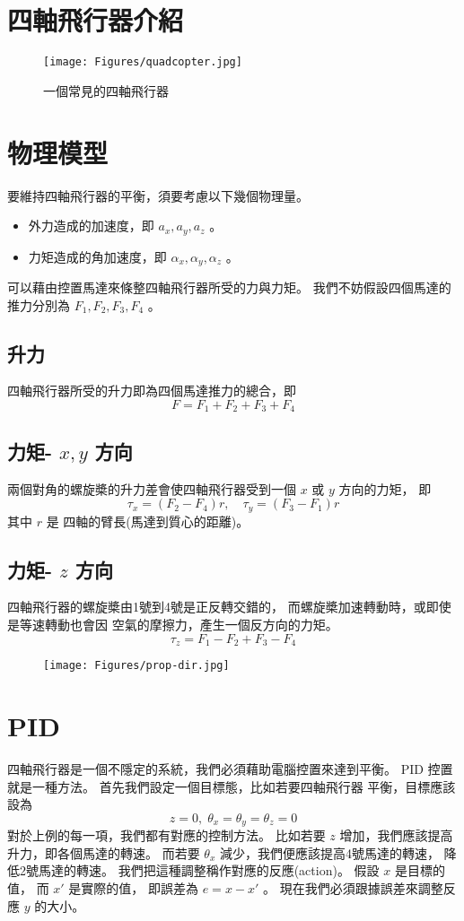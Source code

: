 \documentclass[12pt, a4paper]{article}
\begin{document}
\section{四軸飛行器介紹}
\begin{figure}[H]
  \centering
  \texttt{[image: Figures/quadcopter.jpg]}
\caption{一個常見的四軸飛行器}
\label{fig:}
\end{figure}

\section{物理模型}
要維持四軸飛行器的平衡，須要考慮以下幾個物理量。
\begin{itemize}
  \item 外力造成的加速度，即 $a_x, a_y, a_z$ 。 
  \item 力矩造成的角加速度，即 $\alpha_x, \alpha_y, \alpha_z$ 。 
\end{itemize}
可以藉由控置馬達來條整四軸飛行器所受的力與力矩。
我們不妨假設四個馬達的推力分別為 $F_1, F_2, F_3, F_4$ 。

\subsection{升力}
四軸飛行器所受的升力即為四個馬達推力的總合，即
 \[ F = F_1 + F_2 + F_3 + F_4 \]

\subsection{力矩- $x, y$ 方向}
兩個對角的螺旋槳的升力差會使四軸飛行器受到一個 $x$ 或 $y$ 方向的力矩，
即
\[ \tau_x = (F_2 - F_4) r, \quad \tau_y = (F_3 - F_1) r \]
其中 $r$ 是 四軸的臂長(馬達到質心的距離)。

\subsection{力矩- $z$ 方向}
四軸飛行器的螺旋槳由1號到4號是正反轉交錯的，
而螺旋槳加速轉動時，或即使是等速轉動也會因
空氣的摩擦力，產生一個反方向的力矩。
 \[ \tau_z = F_1 - F_2 + F_3 - F_4 \]
 \begin{figure}[H]
  \centering
  \texttt{[image: Figures/prop-dir.jpg]}
\caption{}
\label{fig:}
\end{figure}

\section{PID}
四軸飛行器是一個不隱定的系統，我們必須藉助電腦控置來達到平衡。
PID 控置就是一種方法。 首先我們設定一個目標態，比如若要四軸飛行器
平衡，目標應該設為
\[ z = 0, \; \theta_x = \theta_y = \theta_z = 0 \]
對於上例的每一項，我們都有對應的控制方法。
比如若要 $z$ 增加，我們應該提高升力，即各個馬達的轉速。
而若要 $\theta_x$ 減少，我們便應該提高4號馬達的轉速，
降低2號馬達的轉速。 我們把這種調整稱作對應的反應(action)。
假設 $x$ 是目標的值， 而 $x'$ 是實際的值， 即誤差為
$e = x - x'$ 。 現在我們必須跟據誤差來調整反應
$y$ 的大小。
\end{document}
